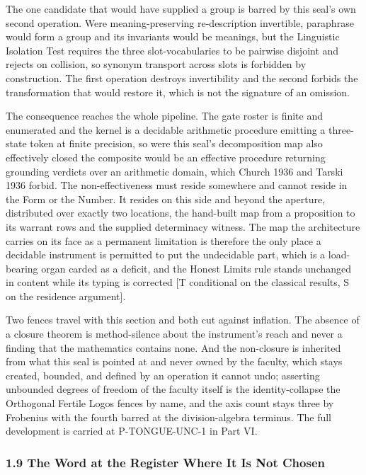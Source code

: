 \documentclass[10pt,twocolumn]{article}
\begin{document}
The one candidate that would have supplied a group is barred by this
seal's own second operation. Were meaning-preserving re-description
invertible, paraphrase would form a group and its invariants would be
meanings, but the Linguistic Isolation Test requires the three
slot-vocabularies to be pairwise disjoint and rejects on collision, so
synonym transport across slots is forbidden by construction. The first
operation destroys invertibility and the second forbids the
transformation that would restore it, which is not the signature of an
omission.

The consequence reaches the whole pipeline. The gate roster is finite
and enumerated and the kernel is a decidable arithmetic procedure
emitting a three-state token at finite precision, so were this seal's
decomposition map also effectively closed the composite would be an
effective procedure returning grounding verdicts over an arithmetic
domain, which Church 1936 and Tarski 1936 forbid. The non-effectiveness
must reside somewhere and cannot reside in the Form or the Number. It
resides on this side and beyond the aperture, distributed over exactly
two locations, the hand-built map from a proposition to its warrant rows
and the supplied determinacy witness. The map the architecture carries
on its face as a permanent limitation is therefore the only place a
decidable instrument is permitted to put the undecidable part, which is
a load-bearing organ carded as a deficit, and the Honest Limits rule
stands unchanged in content while its typing is corrected {[}T
conditional on the classical results, S on the residence argument{]}.

Two fences travel with this section and both cut against inflation. The
absence of a closure theorem is method-silence about the instrument's
reach and never a finding that the mathematics contains none. And the
non-closure is inherited from what this seal is pointed at and never
owned by the faculty, which stays created, bounded, and defined by an
operation it cannot undo; asserting unbounded degrees of freedom of the
faculty itself is the identity-collapse the Orthogonal Fertile Logos
fences by name, and the axis count stays three by Frobenius with the
fourth barred at the division-algebra terminus. The full development is
carried at P-TONGUE-UNC-1 in Part VI.

\hypertarget{the-word-at-the-register-where-it-is-not-chosen}{%
\subsubsection{1.9 The Word at the Register Where It Is Not
Chosen}\label{the-word-at-the-register-where-it-is-not-chosen}}
\end{document}
